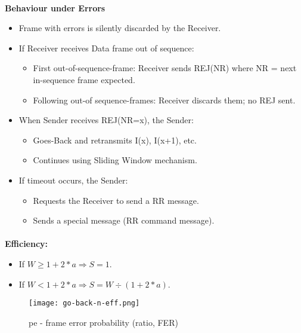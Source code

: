 \documentclass[../resumosRCOM.tex]{subfiles}
\begin{document}
\paragraph{}
\textbf{Behaviour under Errors}
\begin{itemize}
    \item Frame with errors is silently discarded by the Receiver.
    \item If Receiver receives Data frame out of sequence:
    \begin{itemize}
        \item First out-of-sequence-frame: Receiver sends REJ(NR) where NR =
        next in-sequence frame expected.
        \item Following out-of sequence-frames: Receiver discards them; no REJ
        sent.                
    \end{itemize}
    \item When Sender receives REJ(NR=x), the Sender:
    \begin{itemize}
        \item Goes-Back and retransmits I(x), I(x+1), etc.
        \item Continues using Sliding Window mechanism.
    \end{itemize}
    \item If timeout occurs, the Sender:
    \begin{itemize}
        \item Requests the Receiver to send a RR message.
        \item Sends a special message (RR command message).
    \end{itemize}
\end{itemize}

\paragraph{}
\textbf{Efficiency:}
\begin{itemize}
    \item If $W \geq 1 + 2*a \Rightarrow S = 1$.
    \item If $W < 1 + 2*a \Rightarrow S = W \div (1 + 2*a)$.
\end{itemize}

\begin{figure}[H]
    \centering
    \texttt{[image: go-back-n-eff.png]}
    \caption{pe - frame error probability (ratio, FER)}
\end{figure}
\end{document}
